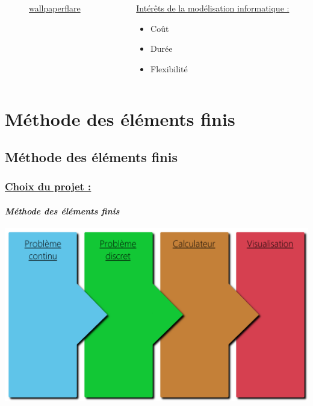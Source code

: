 \documentclass[10pt]{beamer}
\begin{document}
\begin{frame}
\begin{columns}[t]
\begin{column}{5cm}
\begin{figure}
   					\caption{\href{https://www.wallpaperflare.com/black-cables-connection-data-electronics-equipment-ethernet-wallpaper-aryet}{wallpaperflare}}
				\end{figure}
  			\end{column}
 			\begin{column}{5cm}
 				\begin{block}{}
 					\uline{Int\'er\^ets de la mod\'elisation informatique :}
					\begin{itemize}
						\item Co\^ut
						\item Dur\'ee
						\item Flexibilit\'e
					\end{itemize}
				\end{block}
			 \end{column}
 		\end{columns}
	\end{frame}
	
	\section{M\'ethode des \'el\'ements finis}
	\subsection{M\'ethode des \'el\'ements finis}
	\begin{frame}
		\frametitle{\uline{Choix du projet :}}
		\framesubtitle{\textit{M\'ethode des \'el\'ements finis}}
		\centering
		\includegraphics[scale=4.5]{Images/MethodeDesElementsFinis.png}
	\end{frame}
\end{document}
